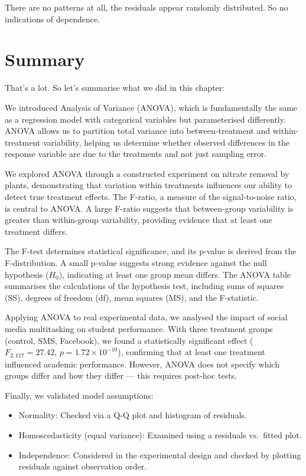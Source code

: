 \documentclass[
  letterpaper,
]{book}
\begin{document}
There are no patterns at all, the residuals appear randomly distributed.
So no indications of dependence.

\section{Summary}\label{summary-2}

That's a lot. So let's summarise what we did in this chapter:

We introduced Analysis of Variance (ANOVA), which is fundamentally the
same as a regression model with categorical variables but parameterised
differently. ANOVA allows us to partition total variance into
between-treatment and within-treatment variability, helping us determine
whether observed differences in the response variable are due to the
treatments and not just sampling error.

We explored ANOVA through a constructed experiment on nitrate removal by
plants, demonstrating that variation within treatments influences our
ability to detect true treatment effects. The F-ratio, a measure of the
signal-to-noise ratio, is central to ANOVA. A large F-ratio suggests
that between-group variability is greater than within-group variability,
providing evidence that at least one treatment differs.

The F-test determines statistical significance, and its p-value is
derived from the F-distribution. A small p-value suggests strong
evidence against the null hypothesis (\(H_0\)), indicating at least one
group mean differs. The ANOVA table summarises the calculations of the
hypothesis test, including sums of squares (SS), degrees of freedom
(df), mean squares (MS), and the F-statistic.

Applying ANOVA to real experimental data, we analysed the impact of
social media multitasking on student performance. With three treatment
groups (control, SMS, Facebook), we found a statistically significant
effect (\(F_{2,117} = 27.42\), \(p=1.72\times10^{-10}\)), confirming
that at least one treatment influenced academic performance. However,
ANOVA does not specify which groups differ and how they differ --- this
requires post-hoc tests.

Finally, we validated model assumptions:

\begin{itemize}
\item
  Normality: Checked via a Q-Q plot and histogram of residuals.
\item
  Homoscedasticity (equal variance): Examined using a residuals
  vs.~fitted plot.
\item
  Independence: Considered in the experimental design and checked by
  plotting residuals against observation order.
\end{itemize}
\end{document}
